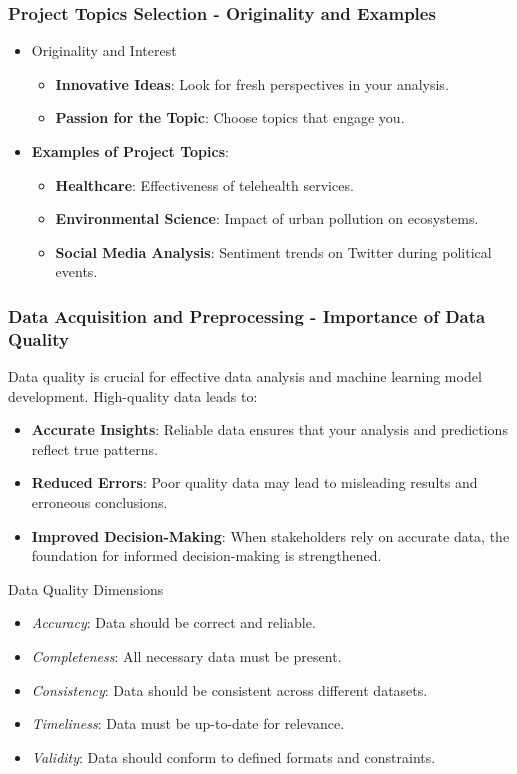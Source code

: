 \documentclass[aspectratio=169]{beamer}
\begin{document}
\begin{frame}[fragile]
    \frametitle{Project Topics Selection - Originality and Examples}
    \begin{itemize}
        \item Originality and Interest
        \begin{itemize}
            \item \textbf{Innovative Ideas}: Look for fresh perspectives in your analysis.
            \item \textbf{Passion for the Topic}: Choose topics that engage you.
        \end{itemize}
        
        \item \textbf{Examples of Project Topics}:
        \begin{itemize}
            \item \textbf{Healthcare}: Effectiveness of telehealth services.
            \item \textbf{Environmental Science}: Impact of urban pollution on ecosystems.
            \item \textbf{Social Media Analysis}: Sentiment trends on Twitter during political events.
        \end{itemize}
    \end{itemize}
\end{frame}

\begin{frame}[fragile]
    \frametitle{Data Acquisition and Preprocessing - Importance of Data Quality}
    Data quality is crucial for effective data analysis and machine learning model development. High-quality data leads to:
    \begin{itemize}
        \item \textbf{Accurate Insights}: Reliable data ensures that your analysis and predictions reflect true patterns.
        \item \textbf{Reduced Errors}: Poor quality data may lead to misleading results and erroneous conclusions.
        \item \textbf{Improved Decision-Making}: When stakeholders rely on accurate data, the foundation for informed decision-making is strengthened.
    \end{itemize}
    
    \begin{block}{Data Quality Dimensions}
        \begin{itemize}
            \item \textit{Accuracy}: Data should be correct and reliable.
            \item \textit{Completeness}: All necessary data must be present.
            \item \textit{Consistency}: Data should be consistent across different datasets.
            \item \textit{Timeliness}: Data must be up-to-date for relevance.
            \item \textit{Validity}: Data should conform to defined formats and constraints.
        \end{itemize}
    \end{block}
\end{frame}
\end{document}
